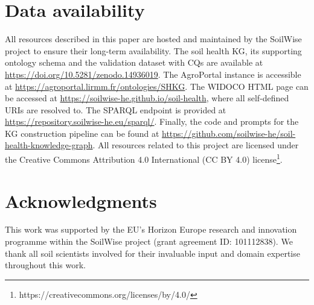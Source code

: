 \documentclass[preprint,12pt]{elsarticle}
\begin{document}
\section*{Data availability}
All resources described in this paper are hosted and maintained by the SoilWise project to ensure their long-term availability. The soil health KG, its supporting ontology schema and the validation dataset with CQs are available at \url{https://doi.org/10.5281/zenodo.14936019}. The AgroPortal instance is accessible at \url{https://agroportal.lirmm.fr/ontologies/SHKG}. The WIDOCO HTML page can be accessed at \url{https://soilwise-he.github.io/soil-health}, where all self-defined URIs are resolved to. The SPARQL endpoint is provided at \url{https://repository.soilwise-he.eu/sparql/}. Finally, the code and prompts for the KG construction pipeline can be found at \url{https://github.com/soilwise-he/soil-health-knowledge-graph}. All resources related to this project are licensed under the Creative Commons Attribution 4.0 International (CC BY 4.0) license\footnote{https://creativecommons.org/licenses/by/4.0/}.

\section*{Acknowledgments}
This work was supported by the EU’s Horizon Europe research and innovation programme within the SoilWise project (grant agreement ID: 101112838). We thank all soil scientists involved for their invaluable input and domain expertise throughout this work.

\appendix
\end{document}
